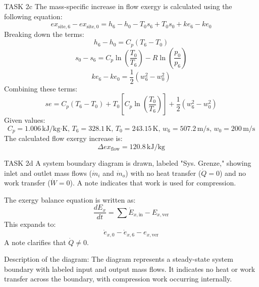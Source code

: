TASK 2c  
The mass-specific increase in flow exergy is calculated using the following equation:  
\[
ex_{\text{site},6} - ex_{\text{site},0} = h_6 - h_0 - T_0 s_6 + T_0 s_0 + ke_6 - ke_0
\]  
Breaking down the terms:  
\[
h_6 - h_0 = C_p (T_6 - T_0)
\]  
\[
s_0 - s_6 = C_p \ln\left(\frac{T_0}{T_6}\right) - R \ln\left(\frac{p_0}{p_6}\right)
\]  
\[
ke_6 - ke_0 = \frac{1}{2}(w_6^2 - w_0^2)
\]  
Combining these terms:  
\[
se = C_p (T_6 - T_0) + T_0 \left[C_p \ln\left(\frac{T_0}{T_6}\right)\right] + \frac{1}{2}(w_6^2 - w_0^2)
\]  
Given values:  
\[
C_p = 1.006 \, \text{kJ/kg·K}, \, T_6 = 328.1 \, \text{K}, \, T_0 = 243.15 \, \text{K}, \, w_6 = 507.2 \, \text{m/s}, \, w_0 = 200 \, \text{m/s}
\]  
The calculated flow exergy increase is:  
\[
\Delta ex_{\text{flow}} = 120.8 \, \text{kJ/kg}
\]  

TASK 2d  
A system boundary diagram is drawn, labeled "Sys. Grenze," showing inlet and outlet mass flows (\( \dot{m}_i \) and \( \dot{m}_o \)) with no heat transfer (\( \dot{Q} = 0 \)) and no work transfer (\( \dot{W} = 0 \)). A note indicates that work is used for compression.  

The exergy balance equation is written as:  
\[
\frac{dE_x}{dt} = \sum \dot{E}_{x,\text{in}} - E_{x,\text{ver}}
\]  
This expands to:  
\[
\dot{e}_{x,0} - \dot{e}_{x,6} - e_{x,\text{ver}}
\]  
A note clarifies that \( \dot{Q} \neq 0 \).  

Description of the diagram:  
The diagram represents a steady-state system boundary with labeled input and output mass flows. It indicates no heat or work transfer across the boundary, with compression work occurring internally.